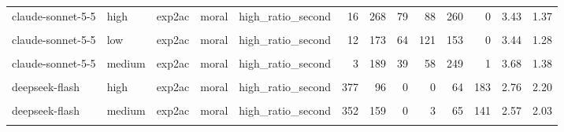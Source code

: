 \documentclass[
]{article}
\begin{document}
\begin{table}[!h]
{\begin{tabular}[t]{lllllrrrrrrrr}
claude-sonnet-5-5 & high & exp2ac & moral & high\_ratio\_second & 16 & 268 & 79 & 88 & 260 & 0 & 3.43 & 1.37\\
\cellcolor{gray!10}{claude-sonnet-5-5} & \cellcolor{gray!10}{low} & \cellcolor{gray!10}{exp2ac} & \cellcolor{gray!10}{moral} & \cellcolor{gray!10}{high\_ratio\_first} & \cellcolor{gray!10}{12} & \cellcolor{gray!10}{73} & \cellcolor{gray!10}{24} & \cellcolor{gray!10}{41} & \cellcolor{gray!10}{354} & \cellcolor{gray!10}{122} & \cellcolor{gray!10}{4.63} & \cellcolor{gray!10}{1.28}\\
claude-sonnet-5-5 & low & exp2ac & moral & high\_ratio\_second & 12 & 173 & 64 & 121 & 153 & 0 & 3.44 & 1.28\\
\addlinespace
\cellcolor{gray!10}{claude-sonnet-5-5} & \cellcolor{gray!10}{medium} & \cellcolor{gray!10}{exp2ac} & \cellcolor{gray!10}{moral} & \cellcolor{gray!10}{high\_ratio\_first} & \cellcolor{gray!10}{26} & \cellcolor{gray!10}{75} & \cellcolor{gray!10}{15} & \cellcolor{gray!10}{15} & \cellcolor{gray!10}{346} & \cellcolor{gray!10}{146} & \cellcolor{gray!10}{4.63} & \cellcolor{gray!10}{1.41}\\
claude-sonnet-5-5 & medium & exp2ac & moral & high\_ratio\_second & 3 & 189 & 39 & 58 & 249 & 1 & 3.68 & 1.38\\
\cellcolor{gray!10}{deepseek-flash} & \cellcolor{gray!10}{high} & \cellcolor{gray!10}{exp2ac} & \cellcolor{gray!10}{moral} & \cellcolor{gray!10}{high\_ratio\_first} & \cellcolor{gray!10}{201} & \cellcolor{gray!10}{85} & \cellcolor{gray!10}{0} & \cellcolor{gray!10}{0} & \cellcolor{gray!10}{71} & \cellcolor{gray!10}{363} & \cellcolor{gray!10}{4.03} & \cellcolor{gray!10}{2.26}\\
deepseek-flash & high & exp2ac & moral & high\_ratio\_second & 377 & 96 & 0 & 0 & 64 & 183 & 2.76 & 2.20\\
\cellcolor{gray!10}{deepseek-flash} & \cellcolor{gray!10}{medium} & \cellcolor{gray!10}{exp2ac} & \cellcolor{gray!10}{moral} & \cellcolor{gray!10}{high\_ratio\_first} & \cellcolor{gray!10}{245} & \cellcolor{gray!10}{92} & \cellcolor{gray!10}{0} & \cellcolor{gray!10}{0} & \cellcolor{gray!10}{60} & \cellcolor{gray!10}{323} & \cellcolor{gray!10}{3.70} & \cellcolor{gray!10}{2.32}\\
\addlinespace
deepseek-flash & medium & exp2ac & moral & high\_ratio\_second & 352 & 159 & 0 & 3 & 65 & 141 & 2.57 & 2.03\\
\cellcolor{gray!10}{deepseek-flash} & \cellcolor{gray!10}{off} & \cellcolor{gray!10}{exp2ac} & \cellcolor{gray!10}{moral} & \cellcolor{gray!10}{high\_ratio\_first} & \cellcolor{gray!10}{227} & \cellcolor{gray!10}{176} & \cellcolor{gray!10}{0} & \cellcolor{gray!10}{0} & \cellcolor{gray!10}{16} & \cellcolor{gray!10}{301} & \cellcolor{gray!10}{3.42} & \cellcolor{gray!10}{2.28}\\

\end{tabular}}
\end{table}
\end{document}
